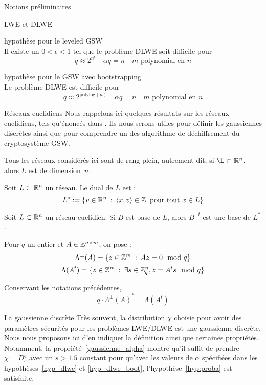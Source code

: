 \begin{section}{Notions préliminaires}
\begin{subsection}{LWE et DLWE}
	\begin{hyp}{hypothèse pour le leveled GSW} \\
	\label{hyp_dlwe}
	Il existe un $0 < \epsilon < 1$ tel que le problème DLWE soit difficile pour 
	\[ q \approx 2^{n^\epsilon}\quad \alpha q = n\quad \text{$m$ polynomial en $n$}\]
	\end{hyp}

	\begin{hyp}{hypothèse pour le GSW avec bootstrapping} \\
	\label{hyp_dlwe_boot}
	Le problème DLWE est difficile pour 
	\[ q \approx 2^\text{polylog$(n)$}\quad \alpha q = n\quad \text{$m$ polynomial en $n$}\]
	\end{hyp}


	\end{subsection}
	\begin{subsection}{Réseaux euclidiens}
	Nous rappelons ici quelques résultats sur les réseaux euclidiens, tels qu'énoncés dans \cite{EC:MicPei12}. Ils nous serons utiles pour définir les gaussiennes discrètes ainsi que pour comprendre un des algorithme de déchiffrement du cryptosystème GSW.

	Tous les réseaux considérés ici sont de rang plein, autrement dit, si $\L \subset \RR^n$, alors $L$ est de
	dimension \nolinebreak$n$.

	\begin{definition}
	Soit $L\subset \mathbb{R}^n$ un réseau. Le dual de $L$ est :
	\[ L^* := \{ v \in \mathbb{R}^n \::\: \langle x, v \rangle \in \mathbb{Z}
	   \:\text{ pour tout } x\in L\} \]
	\end{definition}
	\begin{prop} 
	Soit $L \subset \mathbb{R}^n$ un réseau euclidien. Si $B$ est base de $L$, alors
	$B^{-t}$ est une base de $L^*$.
	\end{prop}

	Pour $q$ un entier et $A \in \mathbb{Z}^{n\times m}$, on pose :
		\[\Lambda^\bot(A) = \{ z \in \mathbb{Z}^m\: :\: A z  = 0 \mod q \}\] 
	\[\Lambda(A^t) = \{ z \in \mathbb{Z}^m\: : \: \exists s\in \mathbb{Z}_q^n, z = A^t s \mod q\}\]

		\begin{prop} \label{lambda_reseau}
	Conservant les notations précédentes, 
	\[q \cdot {\Lambda^\bot(A)}^* =  \Lambda(A^t)\] 
	\end{prop}
	\end{subsection}
	
	\begin{subsection}{La gaussienne discrète}
Très souvent, la distribution $\chi$ choisie pour avoir des paramètres sécurités pour les problèmes LWE/DLWE est une
gaussienne discrète. Nous nous proposons ici d'en indiquer la définition ainsi que certaines propriétés.
Notamment, la propriété~\ref{gaussienne_alpha} montre qu'il suffit de prendre $\chi = D^q_s$ avec un $s > 1.5$ constant
pour qu'avec les valeurs de $\alpha$ spécifiées dans les hypothèses~\ref{hyp_dlwe} et
\ref{hyp_dlwe_boot}, 
l'hypothèse~\ref{hyp:proba} est satisfaite.


\end{subsection}
\end{section}
